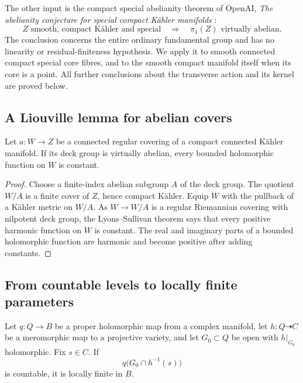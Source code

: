 The other input is the compact special abelianity theorem of OpenAI, \emph{The abelianity conjecture for special compact K\"ahler manifolds} \cite[Theorem~1.1]{SpecialAbelianity}:
\begin{equation}\label{eq:grp-abelianity-input}
 Z\text{ smooth, compact K\"ahler and special}
 \quad\Longrightarrow\quad \pi_1(Z)\text{ virtually abelian}.
\end{equation}
The conclusion concerns the entire ordinary fundamental group and has no linearity or residual-finiteness hypothesis. We apply it to smooth connected compact special core fibres, and to the smooth compact manifold itself when its core is a point. All further conclusions about the transverse action and its kernel are proved below.

\subsection{A Liouville lemma for abelian covers}

\begin{lemma}\label{lem:grp-liouville}
Let $a:W\to Z$ be a connected regular covering of a compact connected K\"ahler manifold. If its deck group is virtually abelian, every bounded holomorphic function on $W$ is constant.
\end{lemma}

\begin{proof}
Choose a finite-index abelian subgroup $A$ of the deck group. The quotient $W/A$ is a finite cover of $Z$, hence compact K\"ahler. Equip $W$ with the pullback of a K\"ahler metric on $W/A$. As $W\to W/A$ is a regular Riemannian covering with nilpotent deck group, the Lyons--Sullivan theorem \cite[Theorem~1, p.~300]{LyonsSullivan1984} says that every positive harmonic function on $W$ is constant. The real and imaginary parts of a bounded holomorphic function are harmonic and become positive after adding constants.
\end{proof}

\subsection{From countable levels to locally finite parameters}

\begin{lemma}\label{lem:grp-finite-level-projection}
Let $q:Q\to B$ be a proper holomorphic map from a complex manifold, let $h:Q\dashrightarrow C$ be a meromorphic map to a projective variety, and let $G_0\subset Q$ be open with $h|_{G_0}$ holomorphic.  Fix $s\in C$. If
\[
 q\bigl(G_0\cap h^{-1}(s)\bigr)
\]
is countable, it is locally finite in $B$.
\end{lemma}

